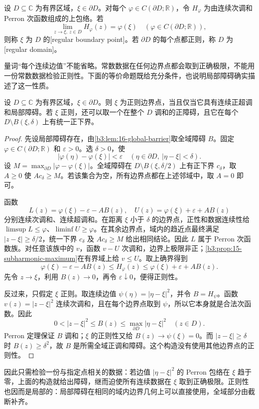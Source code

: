 \begin{definition}\label{b3:def:16-regular-point}
设 \(D\subseteq\mathbb C\) 为有界区域，\(\xi\in\partial D\)。对每个 \(\varphi\in C(\partial D;\mathbb R)\)，令 \(H_\varphi\) 为由连续次调和 Perron 次函数组成的上包络。若
\[
 \lim_{z\to\xi,\ z\in D}H_\varphi(z)=\varphi(\xi)
 \quad\left(\varphi\in C(\partial D;\mathbb R)\right),
\]
则称 \(\xi\) 为 \(D\) 的[regular boundary point]。若 \(\partial D\) 的每个点都正则，称 \(D\) 为[regular domain]。
\end{definition}
量词“每个连续边值”不能省略。常数数据在任何边界点都会取到正确极限，不能用一份常数数据检验正则性。下面的等价命题既给充分条件，也说明局部障碍确实描述了这一性质。

\begin{proposition}[障碍与边界正则性]\label{b3:prop:16-barrier-regular}
设 \(D\subseteq\mathbb C\) 为有界区域，\(\xi\in\partial D\)。则 \(\xi\) 为正则边界点，当且仅当它具有连续正超调和局部障碍。若 \(\xi\) 正则，还可以取一个在整个 \(D\) 调和的正障碍，且它在每个 \(D\setminus B(\xi,\delta)\) 上有统一正下界。
\end{proposition}
\begin{proof}
先设局部障碍存在，由\cref{b3:lem:16-global-barrier}取全域障碍 \(B\)。固定 \(\varphi\in C(\partial D;\mathbb R)\) 和 \(\varepsilon>0\)。选 \(\delta>0\)，使
\[
 |\varphi(\eta)-\varphi(\xi)|<\varepsilon
 \quad\left(\eta\in\partial D,\ |\eta-\xi|<\delta\right).
\]
设 \(M=\max_{\partial D}|\varphi-\varphi(\xi)|\)。全域障碍在 \(D\setminus B(\xi,\delta/2)\) 上有正下界 \(c_\delta\)，取 \(A\ge0\) 使 \(Ac_\delta\ge M\)。若该集合为空，所有边界点都在上述邻域中，取 \(A=0\) 即可。

函数
\[
 L(z)=\varphi(\xi)-\varepsilon-AB(z),
 \quad U(z)=\varphi(\xi)+\varepsilon+AB(z)
\]
分别连续次调和、连续超调和。在距离 \(\xi\) 小于 \(\delta\) 的边界点，正性和数据连续性给 \(\limsup L\le\varphi\)、\(\liminf U\ge\varphi\)。在其余边界点，域内的趋近点最终满足 \(|z-\xi|\ge\delta/2\)，统一下界 \(c_\delta\) 及 \(Ac_\delta\ge M\) 给出相同结论。因此 \(L\) 属于 Perron 次函数族。对任意该族中的 \(v\)，函数 \(v-U\) 次调和，边界上极限非正；\cref{b3:prop:15-subharmonic-maximum}在有界域上给 \(v\le U\)。取上确界得到
\[
 \varphi(\xi)-\varepsilon-AB(z)
 \le H_\varphi(z)\le
 \varphi(\xi)+\varepsilon+AB(z).
\]
先令 \(z\to\xi\)，利用 \(B(z)\to0\)，再令 \(\varepsilon\downarrow0\)，便得正则性。

反过来，只假定 \(\xi\) 正则。取连续边值 \(\psi(\eta)=|\eta-\xi|^2\)，并令 \(B=H_\psi\)。函数 \(v(z)=|z-\xi|^2\) 连续次调和，且在每个边界点取到 \(\psi\)，所以它本身就是合法次函数。因此
\[
 0<|z-\xi|^2\le B(z)\le\max_{\partial D}|\eta-\xi|^2
 \quad(z\in D).
\]
Perron 定理保证 \(B\) 调和；\(\xi\) 的正则性又给 \(B(z)\to\psi(\xi)=0\)。而 \(|z-\xi|\ge\delta\) 时 \(B(z)\ge\delta^2\)，故 \(B\) 是所需全域正调和障碍。这个构造没有使用其他边界点的正则性。
\end{proof}
因此只需检验一份与指定点相关的数据：若边值 \(|\eta-\xi|^2\) 的 Perron 包络在 \(\xi\) 趋于零，上面的构造就给出障碍，继而迫使所有连续数据在 \(\xi\) 取到正确极限。正则性也因而是局部的：局部障碍在相同的域内边界几何上可以直接使用，全域部分由截断补齐。

